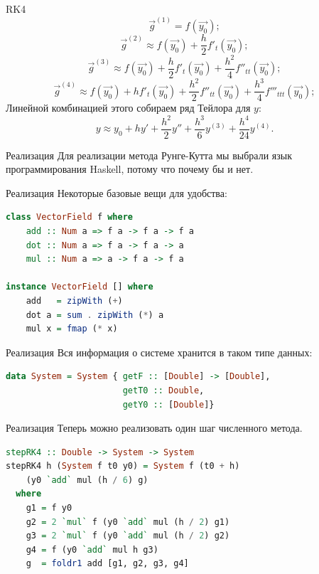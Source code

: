 \documentclass{beamer}
\begin{document}
\begin{frame}{RK4}
	\[ \vec{g}^{(1)} = f(\vec{y_0}); \]
	\[ \vec{g}^{(2)} \approx f(\vec{y_0}) + \frac{h}{2}f'_t(\vec{y_0}); \]
	\[ \vec{g}^{(3)} \approx f(\vec{y_0}) + \frac{h}{2}f'_t(\vec{y_0}) + \frac{h^2}{4}f''_{tt}(\vec{y_0}); \]
	\[ \vec{g}^{(4)} \approx f(\vec{y_0}) + hf'_t(\vec{y_0}) + \frac{h^2}{2}f''_{tt}(\vec{y_0}) + \frac{h^3}{4}f'''_{ttt}(\vec{y_0});\]
	\pause Линейной комбинацией этого собираем ряд Тейлора для $y$:
	\[y \approx y_0 + hy' + \frac{h^2}{2}y'' + \frac{h^3}{6}y^{(3)} + \frac{h^4}{24}y^{(4)}. \]

\end{frame}

\begin{frame}{Реализация}
    Для реализации метода Рунге-Кутта мы выбрали язык программирования Haskell, потому что почему бы и нет.
\end{frame}

\begin{frame}[fragile]{Реализация}
    Некоторые базовые вещи для удобства:
    \begin{lstlisting}[language=Haskell]
class VectorField f where
    add :: Num a => f a -> f a -> f a
    dot :: Num a => f a -> f a -> a
    mul :: Num a => a -> f a -> f a

instance VectorField [] where
    add   = zipWith (+)
    dot a = sum . zipWith (*) a
    mul x = fmap (* x)
    \end{lstlisting}
\end{frame}

\begin{frame}[fragile]{Реализация}
    Вся информация о системе хранится в таком типе данных:
    \begin{lstlisting}[language=Haskell]
data System = System { getF :: [Double] -> [Double],
                       getT0 :: Double,
                       getY0 :: [Double]}
    \end{lstlisting}
\end{frame}

\begin{frame}[fragile]{Реализация}
    Теперь можно реализовать один шаг численного метода.
    \begin{lstlisting}[language=Haskell]
stepRK4 :: Double -> System -> System
stepRK4 h (System f t0 y0) = System f (t0 + h)
    (y0 `add` mul (h / 6) g)
  where
    g1 = f y0
    g2 = 2 `mul` f (y0 `add` mul (h / 2) g1)
    g3 = 2 `mul` f (y0 `add` mul (h / 2) g2)
    g4 = f (y0 `add` mul h g3)
    g  = foldr1 add [g1, g2, g3, g4]
    \end{lstlisting}
\end{frame}
\end{document}
